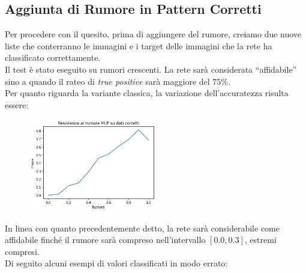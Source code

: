 \documentclass[12pt, a4paper]{article}
\begin{document}
\subsection{Aggiunta di Rumore in Pattern Corretti}
Per procedere con il quesito, prima di aggiungere del rumore, creiamo due nuove liste che conterranno le immagini e i target delle immagini che la rete ha classificato correttamente.\\
Il test è stato eseguito su rumori crescenti. La rete sarà considerata “affidabile” sino a quando il rateo di \textit{true positive} sarà maggiore del \(75\%\).\\
Per quanto riguarda la variante classica, la variazione dell'accuratezza risulta essere:
\begin{figure}[H]
    \centering
    \includegraphics[width=0.50\textwidth]{TPClassica.png}    
\end{figure}
In linea con quanto precedentemente detto, la rete sarà considerabile come affidabile finché il rumore sarà compreso nell'intervallo \([0.0, 0.3]\), estremi compresi.\\
Di seguito alcuni esempi di valori classificati in modo errato:
\end{document}
